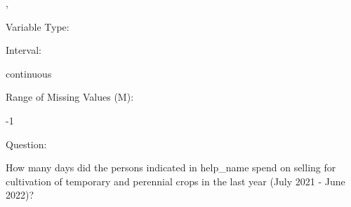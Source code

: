 \documentclass[
]{article}
\begin{document}
,

\begin{minipage}[t]{0.3\linewidth}

\colorbox{mypink1}{}

\end{minipage}%
\begin{minipage}[t]{0.7\linewidth}

\colorbox{mypink1}{\makebox[\textwidth]{\strut\bfseries\color{black}  
 }}

\end{minipage}

\begin{minipage}[t]{0.3\linewidth}

Variable Type:

\end{minipage}%
\begin{minipage}[t]{0.7\linewidth}

\end{minipage}

\begin{minipage}[t]{0.3\linewidth}

Interval:

\end{minipage}%
\begin{minipage}[t]{0.7\linewidth}

continuous

\end{minipage}

\begin{minipage}[t]{0.3\linewidth}

Range of Missing Values (M):

\end{minipage}%
\begin{minipage}[t]{0.7\linewidth}

-1

\end{minipage}

\begin{minipage}[t]{0.3\linewidth}

Question:

\end{minipage}%
\begin{minipage}[t]{0.7\linewidth}

How many days did the persons indicated in help\_name spend on selling
for cultivation of temporary and perennial crops in the last year (July
2021 - June 2022)?

\end{minipage}
\end{document}
